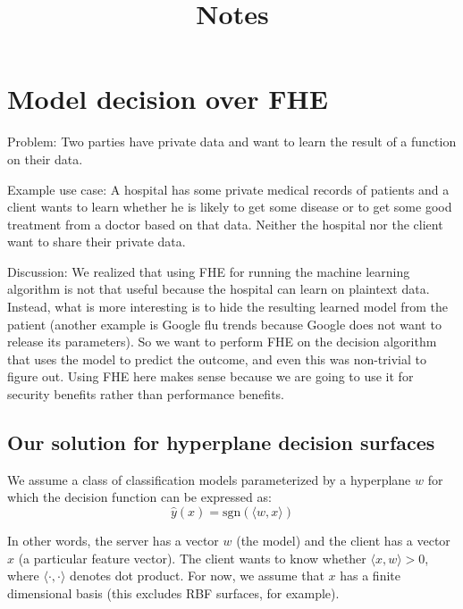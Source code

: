 \documentclass[11pt]{article}
\title{Notes}
\begin{document}
\date{}

\maketitle

\vspace{-2cm}


\section{Model decision over FHE}

Problem: Two parties have private data and want to learn the result of a function on their data.

\noindent Example use case:  A hospital  has some private medical records of patients and a client wants to learn whether he is likely to get some disease or to get some good treatment from a doctor based on that data. Neither the hospital nor the client want to share their private data.

Discussion:
We realized that using FHE for running the machine learning algorithm is not that useful because the hospital can learn on plaintext data. Instead, what is more interesting is to hide the resulting learned model from the patient (another example is Google flu trends because Google does not want to release its parameters). So we want to perform FHE on the decision algorithm that uses the model to predict the outcome, and even this was non-trivial to figure out.
Using FHE here makes sense because we are going to use it for security benefits rather than performance benefits.


\subsection{Our solution for hyperplane decision surfaces}

\newcommand{\res}{\mathsf{res}}

We assume a class of classification models parameterized by a hyperplane $w$
for which the decision function can be expressed as:
\begin{equation*}
  \hat{y}(x) = \text{sgn}(\langle w, x \rangle) 
\end{equation*}

In other words, the server has a vector $w$ (the model) and the client has a
vector $x$ (a particular feature vector). The client wants to know whether
$\langle x, w \rangle > 0$, where $\langle \cdot, \cdot \rangle$ denotes dot product. For
now, we assume that $x$ has a finite dimensional basis (this excludes RBF
surfaces, for example).
\end{document}
